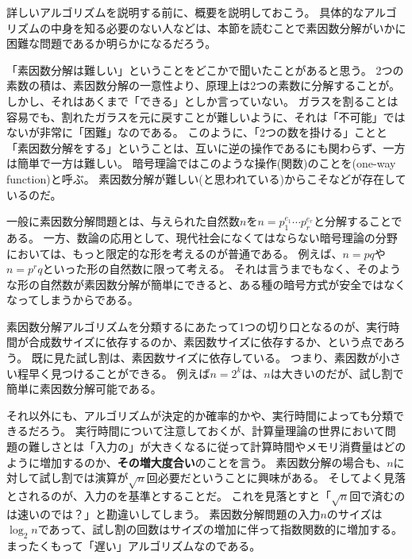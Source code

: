 詳しいアルゴリズムを説明する前に、概要を説明しておこう。
具体的なアルゴリズムの中身を知る必要のない人などは、本節を読むことで素因数分解がいかに困難な問題であるか明らかになるだろう。

「素因数分解は難しい」ということをどこかで聞いたことがあると思う。
2つの素数の積は、素因数分解の一意性より、原理上は2つの素数に分解することが。
しかし、それはあくまで「できる」としか言っていない。
ガラスを割ることは容易でも、割れたガラスを元に戻すことが難しいように、それは「不可能」ではないが非常に「困難」なのである。
このように、「2つの数を掛ける」ことと「素因数分解をする」ということは、互いに逆の操作であるにも関わらず、一方は簡単で一方は難しい。
暗号理論ではこのような操作(関数)のことを(one-way function)と呼ぶ。
素因数分解が難しい(と思われている)からこそなどが存在しているのだ。

一般に素因数分解問題とは、与えられた自然数$n$を$n=p_1^{e_1}\cdots p_r^{e_r}$と分解することである。
一方、数論の応用として、現代社会になくてはならない暗号理論の分野においては、もっと限定的な形を考えるのが普通である。
例えば、$n=pq$や$n=p^rq$といった形の自然数に限って考える。
それは言うまでもなく、そのような形の自然数が素因数分解が簡単にできると、ある種の暗号方式が安全ではなくなってしまうからである。

素因数分解アルゴリズムを分類するにあたって1つの切り口となるのが、実行時間が合成数サイズに依存するのか、素因数サイズに依存するか、という点であろう。
既に見た試し割は、素因数サイズに依存している。
つまり、素因数が小さい程早く見つけることができる。
例えば$n=2^k$は、$n$は大きいのだが、試し割で簡単に素因数分解可能である。

それ以外にも、アルゴリズムが決定的か確率的かや、実行時間によっても分類できるだろう。
実行時間について注意しておくが、計算量理論の世界において問題の難しさとは「入力の」が大きくなるに従って計算時間やメモリ消費量はどのように増加するのか、\textbf{その増大度合い}のことを言う。
素因数分解の場合も、$n$に対して試し割では演算が$\sqrt{n}$回必要だということに興味がある。
そしてよく見落とされるのが、入力のを基準とすることだ。
これを見落とすと「$\sqrt{n}$回で済むのは速いのでは？」と勘違いしてしまう。
素因数分解問題の入力$n$のサイズは$\log_2{n}$であって、試し割の回数はサイズの増加に伴って指数関数的に増加する。
まったくもって「遅い」アルゴリズムなのである。

